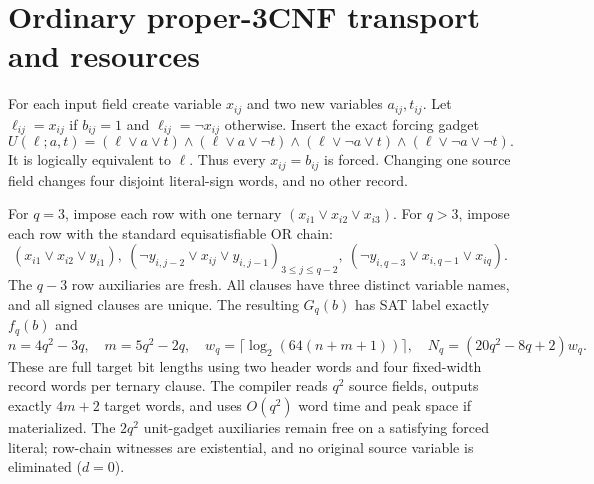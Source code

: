 \documentclass[11pt]{article}
\begin{document}
\section{Ordinary proper-3CNF transport and resources}
For each input field create variable $x_{ij}$ and two new variables $a_{ij},t_{ij}$. Let $\ell_{ij}=x_{ij}$ if $b_{ij}=1$ and $\ell_{ij}=\neg x_{ij}$ otherwise. Insert the exact forcing gadget
\[
U(\ell;a,t)=
(\ell\vee a\vee t)\wedge(\ell\vee a\vee\neg t)\wedge
(\ell\vee\neg a\vee t)\wedge(\ell\vee\neg a\vee\neg t).
\tag{4}
\]
It is logically equivalent to $\ell$. Thus every $x_{ij}=b_{ij}$ is forced. Changing one source field changes four disjoint literal-sign words, and no other record.

For $q=3$, impose each row with one ternary $(x_{i1}\vee x_{i2}\vee x_{i3})$. For $q>3$, impose each row with the standard equisatisfiable OR chain:
\[
(x_{i1}\vee x_{i2}\vee y_{i1}),\
(\neg y_{i,j-2}\vee x_{ij}\vee y_{i,j-1})_{3\le j\le q-2},\
(\neg y_{i,q-3}\vee x_{i,q-1}\vee x_{iq}).
\tag{5}
\]
The $q-3$ row auxiliaries are fresh. All clauses have three distinct variable names, and all signed clauses are unique. The resulting $G_q(b)$ has SAT label exactly $f_q(b)$ and
\[
n=4q^2-3q,\quad m=5q^2-2q,\quad
w_q=\lceil\log_2(64(n+m+1))\rceil,\quad
N_q=(20q^2-8q+2)w_q.
\tag{6}
\]
These are full target bit lengths using two header words and four fixed-width record words per ternary clause. The compiler reads $q^2$ source fields, outputs exactly $4m+2$ target words, and uses $O(q^2)$ word time and peak space if materialized. The $2q^2$ unit-gadget auxiliaries remain free on a satisfying forced literal; row-chain witnesses are existential, and no original source variable is eliminated ($d=0$).
\end{document}
